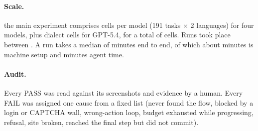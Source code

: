 \paragraph{Scale.}
 the main experiment
comprises  cells per model (191 tasks $\times$ 2 languages) for
four models, plus  dialect cells for GPT-5.4, for a total of
 cells. Runs took place between
. A run takes a median of
 minutes end to end, of which about  minutes is machine
setup and  minutes agent time.

\paragraph{Audit.}
Every PASS was read against its screenshots and evidence by a human. Every
FAIL was assigned one cause from a fixed list (never found the flow, blocked
by a login or CAPTCHA wall, wrong-action loop, budget exhausted while
progressing, refusal, site broken, reached the final step but did not commit).
